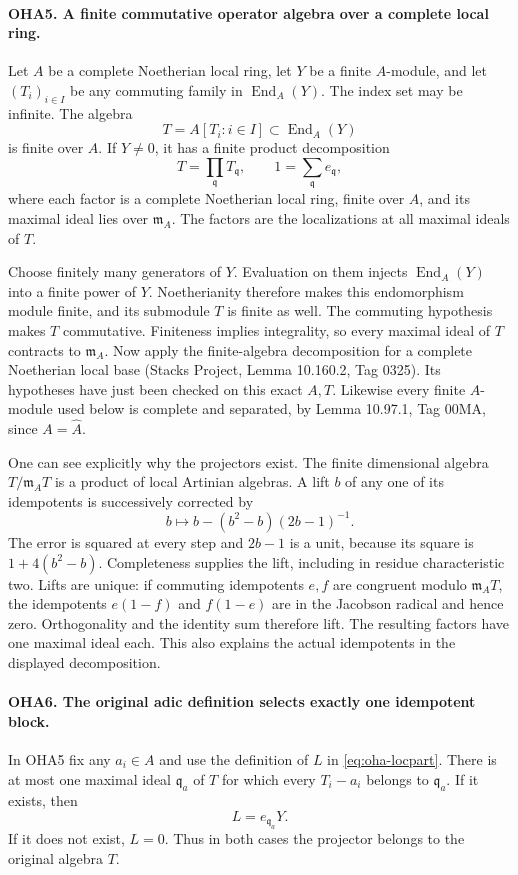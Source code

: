 \documentclass[11pt,a4paper]{article}
\numberwithin{equation}{section}
\theoremstyle{remark}\newtheorem{remark}[theorem]{Remark}
\begin{document}
\paragraph{OHA5. A finite commutative operator algebra over a complete local ring.}
\label{claim:OHA5}
Let \(A\) be a complete Noetherian local ring, let \(Y\) be a
finite \(A\)-module, and let \((T_i)_{i\in I}\) be any commuting
family in \(\operatorname{End}_A(Y)\). The index set may be
infinite. The algebra
\[
                      T=A[T_i:i\in I]\subset\operatorname{End}_A(Y)
\]
is finite over \(A\). If \(Y\ne0\), it has a finite product
decomposition
\[
                 T=\prod_{\mathfrak q}T_{\mathfrak q},
                 \qquad 1=\sum_{\mathfrak q}e_{\mathfrak q},
\]
where each factor is a complete Noetherian local ring, finite
over \(A\), and its maximal ideal lies over \(\mathfrak m_A\).
The factors are the localizations at all maximal ideals of \(T\).

Choose finitely many generators of \(Y\). Evaluation on them
injects \(\operatorname{End}_A(Y)\) into a finite power of \(Y\).
Noetherianity therefore makes this endomorphism module finite,
and its submodule \(T\) is finite as well. The commuting hypothesis
makes \(T\) commutative. Finiteness implies integrality, so every
maximal ideal of \(T\) contracts to \(\mathfrak m_A\).
Now apply the finite-algebra decomposition for a complete
Noetherian local base (Stacks Project, Lemma 10.160.2, Tag 0325).
Its hypotheses have just been checked on this exact \(A,\allowbreak{} T\).
Likewise every finite \(A\)-module used below is complete and
separated, by Lemma 10.97.1, Tag 00MA, since \(A=\widehat A\).

One can see explicitly why the projectors exist. The finite
dimensional algebra \(T/\mathfrak m_AT\) is a product of local
Artinian algebras. A lift \(b\) of any one of its idempotents
is successively corrected by
\[
                 b\longmapsto b-(b^2-b)(2b-1)^{-1}.
\]
The error is squared at every step and \(2b-1\) is a unit,
because its square is \(1+4(b^2-b)\). Completeness supplies
the lift, including in residue characteristic two. Lifts are
unique: if commuting idempotents \(e,\allowbreak{} f\) are congruent modulo
\(\mathfrak m_AT\), the idempotents \(e(1-f)\) and \(f(1-e)\)
are in the Jacobson radical and hence zero. Orthogonality and
the identity sum therefore lift. The resulting factors have
one maximal ideal each. This also explains the actual
idempotents in the displayed decomposition.

\paragraph{OHA6. The original adic definition selects exactly one idempotent block.}
\label{claim:OHA6}
In OHA5 fix any \(a_i\in A\) and use the definition of \(L\)
in \eqref{eq:oha-locpart}. There is at most one maximal ideal
\(\mathfrak q_a\) of \(T\) for which every \(T_i-a_i\) belongs
to \(\mathfrak q_a\). If it exists, then
\[
                            L=e_{\mathfrak q_a}Y .
                            \tag{OHA.1}
\]
If it does not exist, \(L=0\). Thus in both cases the projector
belongs to the original algebra \(T\).
\end{document}
